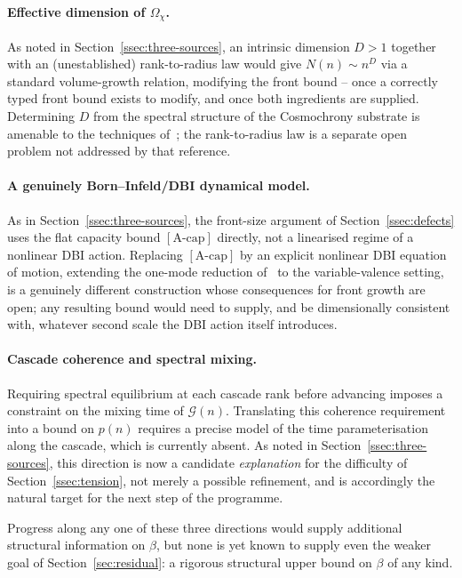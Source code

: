 \documentclass[11pt,a4paper]{article}
\theoremstyle{definition}
\theoremstyle{remark}
\begin{document}
    \paragraph{Effective dimension of $\Omega_\chi$.}
      As noted in Section~\ref{ssec:three-sources}, an intrinsic dimension $D>1$ together with
      an (unestablished) rank-to-radius law would give $N(n) \sim n^D$ via a standard
      volume-growth relation, modifying the front bound -- once a correctly typed front bound
      exists to modify, and once both ingredients are supplied.
      Determining $D$ from the spectral structure of the Cosmochrony substrate is amenable to
      the techniques of~\cite{Beau2026a}; the rank-to-radius law is a separate open problem
      not addressed by that reference.

    \paragraph{A genuinely Born--Infeld/DBI dynamical model.}
      As in Section~\ref{ssec:three-sources}, the front-size argument of
      Section~\ref{ssec:defects} uses the flat capacity bound $[\text{A-cap}]$ directly, not
      a linearised regime of a nonlinear DBI action.
      Replacing $[\text{A-cap}]$ by an explicit nonlinear DBI equation of motion, extending the
      one-mode reduction of~\cite{Beau2026a1} to the variable-valence setting, is a genuinely
      different construction whose consequences for front growth are open; any resulting
      bound would need to supply, and be dimensionally consistent with, whatever second scale
      the DBI action itself introduces.

    \paragraph{Cascade coherence and spectral mixing.}
      Requiring spectral equilibrium at each cascade rank before advancing imposes a constraint
      on the mixing time of $\mathcal{G}(n)$.
      Translating this coherence requirement into a bound on $p(n)$ requires a precise model of
      the time parameterisation along the cascade, which is currently absent.
      As noted in Section~\ref{ssec:three-sources}, this direction is now a candidate
      \emph{explanation} for the difficulty of Section~\ref{ssec:tension}, not merely a
      possible refinement, and is accordingly the natural target for the next step of the
      programme.

      \medskip
      Progress along any one of these three directions would supply additional structural
      information on $\beta$, but none is yet known to supply even the weaker goal of
      Section~\ref{sec:residual}: a rigorous structural upper bound on $\beta$ of any kind.

      
      
\end{document}
